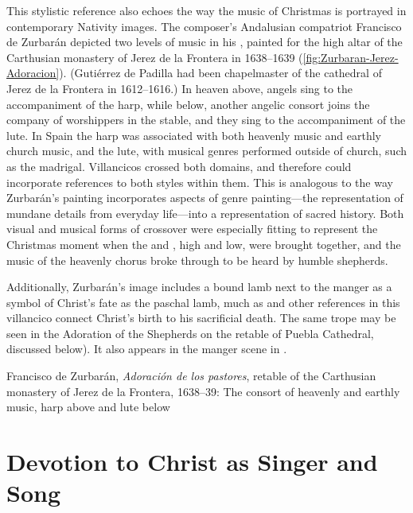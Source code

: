 This stylistic reference also echoes the way the music of Christmas is portrayed
in contemporary Nativity images.
The composer's Andalusian compatriot Francisco de Zurbarán depicted two levels
of music in his , painted for the high altar
of the Carthusian monastery of Jerez de la Frontera in 1638--1639
(\cref{fig:Zurbaran-Jerez-Adoracion}).
(Gutiérrez de Padilla had been chapelmaster of the cathedral of Jerez de la
Frontera in 1612--1616.)%
    \Autocite{Gembero:Padilla}
In heaven above, angels sing to the accompaniment of the harp, while below,
another angelic consort joins the company of worshippers in the stable, and they
sing to the accompaniment of the lute.
In Spain the harp was associated with both heavenly music and earthly church
music, and the lute, with musical genres performed outside of church, such as
the madrigal.
Villancicos crossed both domains, and therefore could incorporate references to
both styles within them.
This is analogous to the way Zurbarán's painting incorporates aspects of genre
painting---the representation of mundane details from everyday life---into a
representation of sacred history.%
    \Autocites[31]{Sanchez:Zurbaran}{Cherry:Bodegon}{Haraszti-Takacs:Genre}
Both visual and musical forms of crossover were especially fitting to represent
the Christmas moment when the  and , high and low,
were brought together, and the music of the heavenly chorus broke through to be
heard by humble shepherds.%
\begin{Footnote}
    Additionally, Zurbarán's image includes a bound lamb next to the manger as a
    symbol of Christ's fate as the paschal lamb, much as  and other references in this villancico connect Christ's birth
    to his sacrificial death.
    The same trope may be seen in the Adoration of the Shepherds on the retable
    of Puebla Cathedral, discussed below).
    It also appears in the manger scene in
    \autocite[168]{Catholic:Breviarium1631}.
\end{Footnote}

{Francisco de Zurbarán, \emph{Adoración de los pastores}, retable of the
Carthusian monastery of Jerez de la Frontera, 1638--39: The consort of heavenly
and earthly music, harp above and lute below}

\section{Devotion to Christ as Singer and Song}

